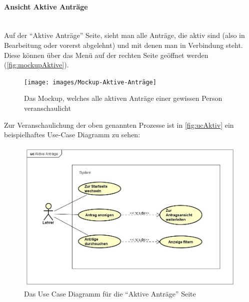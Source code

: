 \paragraph{Ansicht Aktive Anträge}
~\\
Auf der \enquote{Aktive Anträge} Seite, sieht man alle Anträge, die aktiv sind (also in Bearbeitung oder vorerst abgelehnt) und mit denen man in Verbindung steht. Diese können über das Menü auf der rechten Seite geöffnet werden (\autoref{fig:mockupAktive}).
\begin{figure}[H]
	\centering
	\texttt{[image: images/Mockup-Aktive-Anträge]}
	\caption[Mokup aktive Anträge]{Das Mockup, welches alle aktiven Anträge einer gewissen Person veranschaulicht}
	\label{fig:mockupAktive}
\end{figure}
Zur Veranschaulichung der oben genannten Prozesse ist in \autoref{fig:ucAktiv} ein beispielhaftes Use-Case Diagramm zu sehen: 
\begin{figure}[H]
	\centering
	\includegraphics[width=1\linewidth]{images/uc-active}
	\caption[Use Case Diagramm Aktive Anträge]{Das Use Case Diagramm für die \enquote{Aktive Anträge} Seite}
	\label{fig:ucAktiv}
\end{figure}
\newpage
